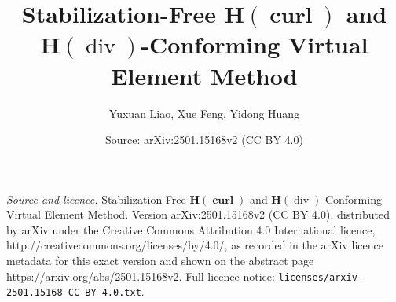 \documentclass[10pt,a4paper]{amsart}
\title{Stabilization-Free \(\mathbf{H}\left(\operatorname{\mathbf{curl}}\right)\) and \(\mathbf{H}\left(\operatorname{div}\right)\)-Conforming Virtual Element Method}
\author{Yuxuan Liao, Xue Feng, Yidong Huang}
\date{Source: arXiv:2501.15168v2 (CC BY 4.0)}
\begin{document}
\maketitle

\noindent\emph{Source and licence.} Stabilization-Free \(\mathbf{H}\left(\operatorname{\mathbf{curl}}\right)\) and \(\mathbf{H}\left(\operatorname{div}\right)\)-Conforming Virtual Element Method. Version arXiv:2501.15168v2 (CC BY 4.0), distributed by arXiv under the Creative Commons Attribution 4.0 International licence, http://creativecommons.org/licenses/by/4.0/, as recorded in the arXiv licence metadata for this exact version and shown on the abstract page https://arxiv.org/abs/2501.15168v2. Full licence notice: \texttt{licenses/arxiv-2501.15168-CC-BY-4.0.txt}.\par\smallskip
\end{document}

